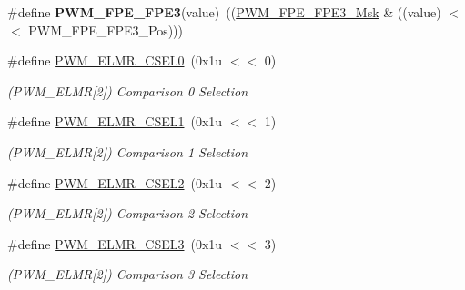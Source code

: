 \begin{DoxyCompactItemize}
\mbox{\label{group__SAMS70__PWM_ga56f3977d54926be1c1452956df6b820f}} 
\#define {\bfseries P\+W\+M\+\_\+\+F\+P\+E\+\_\+\+F\+P\+E3}(value)~((\mbox{\hyperlink{group__SAMV71__PWM_gaca9a5e5dcb472caf52d3c2c8b0321657}{P\+W\+M\+\_\+\+F\+P\+E\+\_\+\+F\+P\+E3\+\_\+\+Msk}} \& ((value) $<$$<$ P\+W\+M\+\_\+\+F\+P\+E\+\_\+\+F\+P\+E3\+\_\+\+Pos)))
\item 
\mbox{\label{group__SAMS70__PWM_ga469a975b28cf04cd35f871f253b7a3b3}} 
\#define \mbox{\hyperlink{group__SAMS70__PWM_ga469a975b28cf04cd35f871f253b7a3b3}{P\+W\+M\+\_\+\+E\+L\+M\+R\+\_\+\+C\+S\+E\+L0}}~(0x1u $<$$<$ 0)
\begin{DoxyCompactList}\small\item\em (P\+W\+M\+\_\+\+E\+L\+MR\mbox{[}2\mbox{]}) Comparison 0 Selection \end{DoxyCompactList}\item 
\mbox{\label{group__SAMS70__PWM_ga08f6b7258c6bc91e429811ccd14a8310}} 
\#define \mbox{\hyperlink{group__SAMS70__PWM_ga08f6b7258c6bc91e429811ccd14a8310}{P\+W\+M\+\_\+\+E\+L\+M\+R\+\_\+\+C\+S\+E\+L1}}~(0x1u $<$$<$ 1)
\begin{DoxyCompactList}\small\item\em (P\+W\+M\+\_\+\+E\+L\+MR\mbox{[}2\mbox{]}) Comparison 1 Selection \end{DoxyCompactList}\item 
\mbox{\label{group__SAMS70__PWM_gabec0c8acd271024f3e167e644a3d2d27}} 
\#define \mbox{\hyperlink{group__SAMS70__PWM_gabec0c8acd271024f3e167e644a3d2d27}{P\+W\+M\+\_\+\+E\+L\+M\+R\+\_\+\+C\+S\+E\+L2}}~(0x1u $<$$<$ 2)
\begin{DoxyCompactList}\small\item\em (P\+W\+M\+\_\+\+E\+L\+MR\mbox{[}2\mbox{]}) Comparison 2 Selection \end{DoxyCompactList}\item 
\mbox{\label{group__SAMS70__PWM_ga02f65ca00c0fbbfe5b44af28f6a73f63}} 
\#define \mbox{\hyperlink{group__SAMS70__PWM_ga02f65ca00c0fbbfe5b44af28f6a73f63}{P\+W\+M\+\_\+\+E\+L\+M\+R\+\_\+\+C\+S\+E\+L3}}~(0x1u $<$$<$ 3)
\begin{DoxyCompactList}\small\item\em (P\+W\+M\+\_\+\+E\+L\+MR\mbox{[}2\mbox{]}) Comparison 3 Selection \end{DoxyCompactList}\item 
$$
\end{DoxyCompactItemize}
